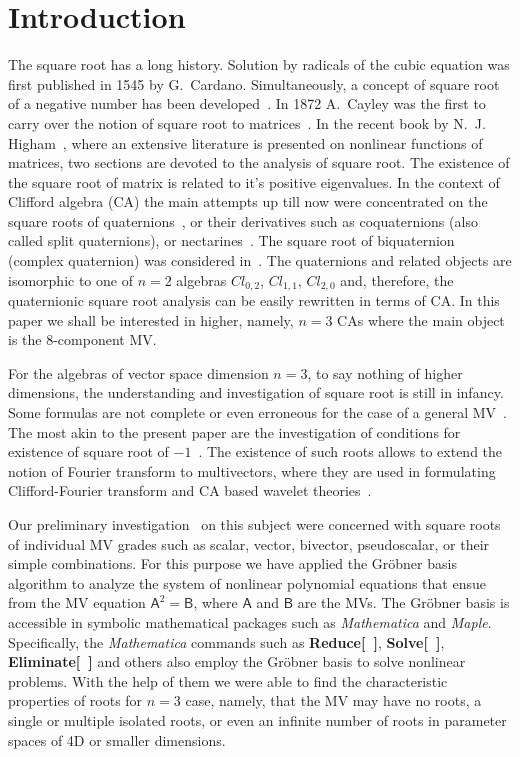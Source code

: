 \documentclass{birkjour}
\newcommand{\cl}[2]{\ensuremath{\mathit{Cl}_{#1,#2}}}
\def\A{\mathsf{A}}
\def\B{\mathsf{B}}
\begin{document}
\section{Introduction}\label{sec:intro}
The square root has a long history. Solution by radicals of the
cubic equation was first published  in 1545 by G.~Cardano.
Simultaneously, a concept of square root of a negative number  has
been developed~\cite{Grant2015}. In 1872 A.~Cayley was the first
to carry over the notion of square root to
matrices~\cite{Cayley1872}. In the recent book by  N.~J.
Higham~\cite{Higham08}, where an extensive literature is presented
on nonlinear functions of matrices, two sections are devoted to
the analysis of square root. The existence of the square root of
matrix is related to it's positive eigenvalues. In the context of
Clifford algebra (CA) the main attempts up till now were
concentrated on the square roots of
quaternions~\cite{Niven1942,Opfer2017}, or their derivatives such
as coquaternions (also called split quaternions), or
nectarines~\cite{Falcao2018,Opfer2017,Ozdemir2009}. The square
root of biquaternion (complex quaternion) was considered
in~\cite{Sangwine2006}. The quaternions and related objects are
isomorphic to one of $n=2$ algebras \cl{0}{2}, \cl{1}{1},
\cl{2}{0} and, therefore, the quaternionic square root analysis
can be easily rewritten in  terms of CA. In this paper we shall be
interested in higher, namely, $n=3$ CAs where the main object is
the 8-component MV.


For the algebras of vector space dimension $n=3$, to say nothing
of higher dimensions, the understanding and investigation of
square root is still in infancy. Some formulas are not complete or
even erroneous for the case of a general MV~\cite{Chapell2015}.
The most akin to the present paper are the investigation of
conditions for existence of square root of
$-1$~\cite{Hitzer2011,Hitzer2013,Sangwine2006}. The existence of
such roots allows to extend the notion of Fourier transform to
multivectors, where they are used in formulating Clifford-Fourier
transform and CA based wavelet theories~\cite{Hitzer13B}.

Our preliminary investigation~\cite{Dargys2019} on this subject
were concerned with square roots of individual MV grades such as
scalar, vector, bivector, pseudoscalar, or their simple
combinations. For this purpose we have applied the Gr{\"o}bner
basis algorithm to analyze the  system of nonlinear polynomial
equations that ensue from the MV equation $\A^2=\B$, where $\A$
and $\B$ are the MVs. The Gr{\"o}bner basis is accessible in
symbolic mathematical packages such as \textit{Mathematica} and
\textit{Maple}. Specifically, the \textit{Mathematica} commands
such as \textbf{Reduce[~]}, \textbf{Solve[~]},
\textbf{Eliminate[~]} and others also employ the Gr{\"o}bner basis
to solve nonlinear problems. With the help of them we were able to
find the characteristic properties of roots for $n=3$ case,
namely, that the MV may have no roots, a single or multiple
isolated roots, or even an infinite number of roots in parameter
spaces of 4D or smaller dimensions.
\end{document}
